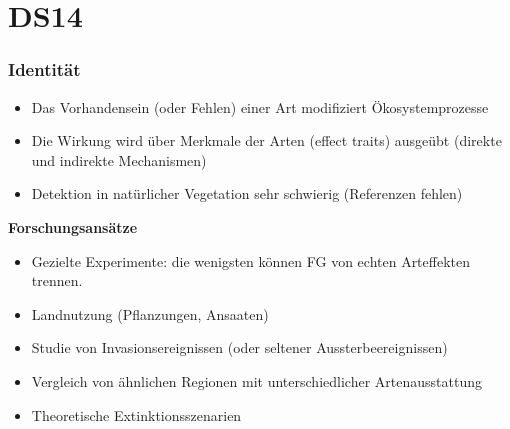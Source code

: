 \section{DS14}
\subsubsection{Identität}
\begin{itemize}
	\item Das Vorhandensein (oder Fehlen) einer Art modifiziert Ökosystemprozesse
	\item Die Wirkung wird über Merkmale der Arten (effect traits) ausgeübt (direkte und indirekte Mechanismen)
	\item Detektion in natürlicher Vegetation sehr schwierig (Referenzen fehlen)
\end{itemize}

\textbf{Forschungsansätze}
\begin{itemize}
	\item Gezielte Experimente: die wenigsten können FG von echten Arteffekten trennen.
	\item Landnutzung (Pflanzungen, Ansaaten)
	\item Studie von Invasionsereignissen (oder seltener Aussterbeereignissen)
	\item Vergleich von ähnlichen Regionen mit unterschiedlicher Artenausstattung
	\item Theoretische Extinktionsszenarien
\end{itemize}

